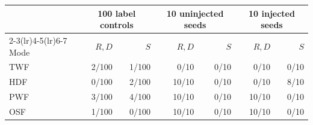 \begin{tabular}{@{}lrrrrrr@{}}
\toprule
& \multicolumn{2}{c}{100 label controls} & \multicolumn{2}{c}{10 uninjected seeds} & \multicolumn{2}{c}{10 injected seeds} \\
\cmidrule(lr){2-3}\cmidrule(lr){4-5}\cmidrule(lr){6-7}
Mode & $R,D$ & $S$ & $R,D$ & $S$ & $R,D$ & $S$ \\
\midrule
TWF & 2/100 & 1/100 & 0/10 & 0/10 & 0/10 & 0/10 \\
HDF & 0/100 & 2/100 & 10/10 & 0/10 & 0/10 & 8/10 \\
PWF & 3/100 & 4/100 & 10/10 & 0/10 & 10/10 & 0/10 \\
OSF & 1/100 & 0/100 & 10/10 & 0/10 & 10/10 & 0/10 \\
\bottomrule
\end{tabular}
